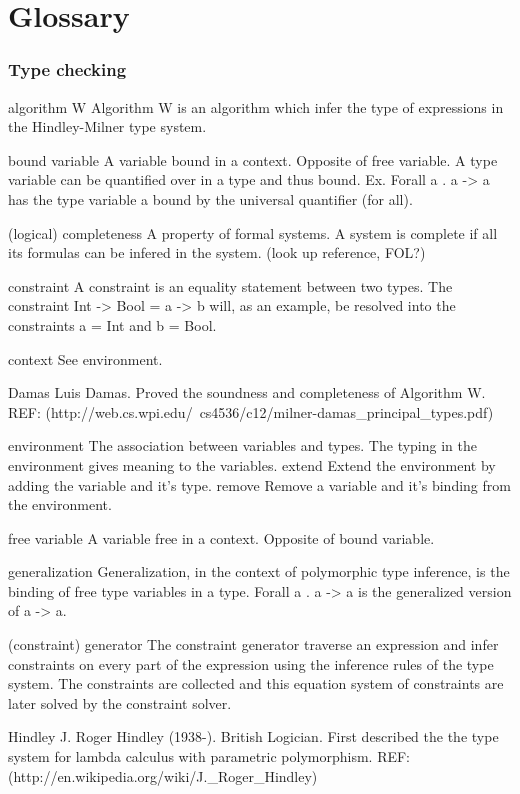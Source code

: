 \chapter{Glossary}

\subsection{Type checking}

algorithm W
Algorithm W is an algorithm which infer the type of expressions in the Hindley-Milner type system.

bound variable
A variable bound in a context. Opposite of free variable. A type variable can be quantified over in a type and thus bound. Ex. Forall a . a -> a has the type variable a bound by the universal quantifier (for all).

(logical) completeness
A property of formal systems. A system is complete if all its formulas can be infered in the system.
(look up reference, FOL?)

constraint
A constraint is an equality statement between two types.
The constraint Int -> Bool = a -> b will, as an example, be resolved into the constraints a = Int and b = Bool.

context
See environment.

Damas
Luis Damas. Proved the soundness and completeness of Algorithm W. REF: (http://web.cs.wpi.edu/~cs4536/c12/milner-damas_principal_types.pdf)

environment
The association between variables and types. The typing in the environment gives meaning to the variables. 
  extend
    Extend the environment by adding the variable and it's type.
  remove
    Remove a variable and it's binding from the environment.

free variable
A variable free in a context. Opposite of bound variable.

generalization
Generalization, in the context of polymorphic type inference, is the binding of free type variables in a type. Forall a . a -> a is the generalized version of a -> a. 

(constraint) generator
The constraint generator traverse an expression and infer constraints on every part of the expression using the inference rules of the type system. The constraints are collected and this equation system of constraints are later solved by the constraint solver.

Hindley
J. Roger Hindley (1938-). British Logician. First described the the type system for lambda calculus with parametric polymorphism. REF: (http://en.wikipedia.org/wiki/J._Roger_Hindley)

